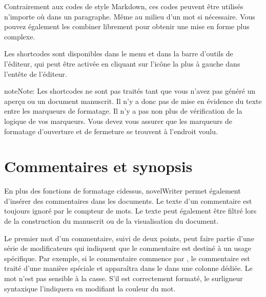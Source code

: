 \documentclass[a4paper,11pt,french]{sphinxmanual}
\begin{document}
\sphinxAtStartPar
Contrairement aux codes de style Markdown, ces codes peuvent être utilisés n’importe où dans un paragraphe. Même au milieu d’un mot si nécessaire. Vous pouvez également les combiner librement pour obtenir une mise en forme plus complexe.

\sphinxAtStartPar
Les shortcodes sont disponibles dans le menu  et dans la barre d’outils de l’éditeur, qui peut être activée en cliquant sur l’icône la plus à gauche dans l’en\sphinxhyphen{}tête de l’éditeur.

\begin{sphinxadmonition}{note}{Note:}
\sphinxAtStartPar
Les shortcodes ne sont pas traités tant que vous n’avez pas généré un aperçu ou un document manuscrit. Il n’y a donc pas de mise en évidence du texte entre les marqueurs de formatage. Il n’y a pas non plus de vérification de la logique de vos marqueurs. Vous devez vous assurer que les marqueurs de formatage d’ouverture et de fermeture se trouvent à l’endroit voulu.
\end{sphinxadmonition}

\sphinxAtStartPar
{}


\section{Commentaires et synopsis}
\label{\detokenize{usage_format:comments-and-synopsis}}\label{\detokenize{usage_format:a-fmt-comm}}
\sphinxAtStartPar
En plus des fonctions de formatage ci\sphinxhyphen{}dessus, novelWriter permet également d’insérer des commentaires dans les documents. Le texte d’un commentaire est toujours ignoré par le compteur de mots. Le texte peut également être filtré lors de la construction du manuscrit ou de la visualisation du document.

\sphinxAtStartPar
Le premier mot d’un commentaire, suivi de deux points, peut faire partie d’une série de modificateurs qui indiquent que le commentaire est destiné à un usage spécifique. Par exemple, si le commentaire commence par , le commentaire est traité d’une manière spéciale et apparaîtra dans le {\hyperref[\detokenize{usage_project:a-ui-outline}]{}} dans une colonne dédiée. Le mot  n’est pas sensible à la casse. S’il est correctement formaté, le surligneur syntaxique l’indiquera en modifiant la couleur du mot.
\end{document}
